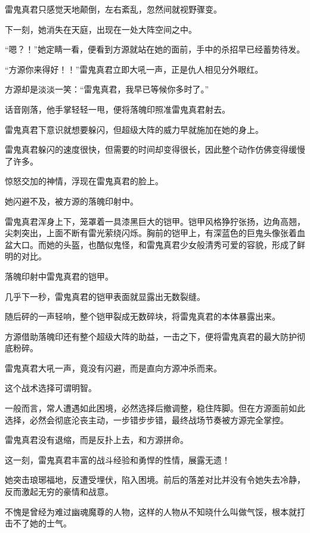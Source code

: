 
\begin{this_body}

雷鬼真君只感觉天地颠倒，左右紊乱，忽然间就视野骤变。

下一刻，她消失在天庭，出现在一处大阵空间之中。

“嗯？！”她定睛一看，便看到方源就站在她的面前，手中的杀招早已经蓄势待发。

“方源你来得好！！”雷鬼真君立即大吼一声，正是仇人相见分外眼红。

方源却是淡淡一笑：“雷鬼真君，我早已等候你多时了。”

话音刚落，他手掌轻轻一甩，便将落魄印照准雷鬼真君射去。

雷鬼真君下意识就想要躲闪，但超级大阵的威力早就施加在她的身上。

雷鬼真君躲闪的速度很快，但需要的时间却变得很长，因此整个动作仿佛变得缓慢了许多。

惊怒交加的神情，浮现在雷鬼真君的脸上。

她闪避不及，被方源的落魄印射中。

雷鬼真君浑身上下，笼罩着一具漆黑巨大的铠甲。铠甲风格狰狞张扬，边角高翘，尖刺突出，上面不断有雷光萦绕闪烁。胸前的铠甲上，有深蓝色的巨鬼头像张着血盆大口。而她的头盔，也酷似鬼怪，和雷鬼真君少女般清秀可爱的容貌，形成了鲜明的对比。

落魄印射中雷鬼真君的铠甲。

几乎下一秒，雷鬼真君的铠甲表面就显露出无数裂缝。

随后砰的一声轻响，整个铠甲裂成无数碎块，将雷鬼真君的本体暴露出来。

方源借助落魄印还有整个超级大阵的助益，一击之下，便将雷鬼真君的最大防护彻底粉碎。

雷鬼真君大吼一声，竟没有闪避，而是直向方源冲杀而来。

这个战术选择可谓明智。

一般而言，常人遭遇如此困境，必然选择后撤调整，稳住阵脚。但在方源面前如此选择，必然会彻底沦丧主动，一步错步步错，最终战场节奏被方源完全掌控。

雷鬼真君没有退缩，而是反扑上去，和方源拼命。

这一刻，雷鬼真君丰富的战斗经验和勇悍的性情，展露无遗！

她突击琅琊福地，反遭受埋伏，陷入困境。前后的落差对比并没有令她失去冷静，反而激起无穷的豪情和战意。

不愧是曾经为难过幽魂魔尊的人物，这样的人物从不知晓什么叫做气馁，根本就打击不了她的士气。


\end{this_body}
